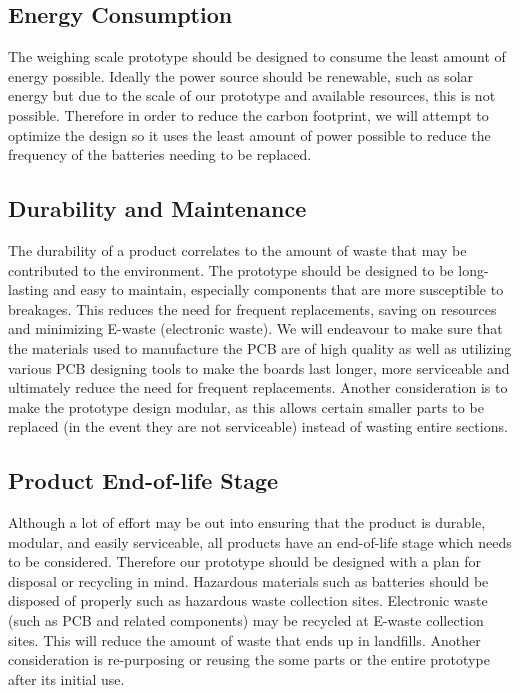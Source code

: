 \subsection{Energy Consumption}

The weighing scale prototype should be designed to consume the least amount of energy possible. Ideally the power source should be renewable, such as solar energy but due to the scale of our prototype and available resources, this is not possible. Therefore in order to reduce the carbon footprint, we will attempt to optimize the design so it uses the least amount of power possible to reduce the frequency of the batteries needing to be replaced.

\subsection{Durability and Maintenance}

The durability of a product correlates to the amount of waste that may be contributed to the environment. The prototype should be designed to be long-lasting and easy to maintain, especially components that are more susceptible to breakages. This reduces the need for frequent replacements, saving on resources and minimizing E-waste (electronic waste). We will endeavour to make sure that the materials used to manufacture the PCB are of high quality as well as utilizing various PCB designing tools to make the boards last longer, more serviceable and ultimately reduce the need for frequent replacements. Another consideration is to make the prototype design modular, as this allows certain smaller parts to be replaced (in the event they are not serviceable) instead of wasting entire sections. 

\subsection{Product End-of-life Stage}

Although a lot of effort may be out into ensuring that the product is durable, modular, and easily serviceable, all products have an end-of-life stage which needs to be considered. Therefore our prototype should be designed with a plan for disposal or recycling in mind. Hazardous materials such as batteries should be disposed of properly such as hazardous waste collection sites. Electronic waste (such as PCB and related components) may be recycled at E-waste collection sites. This will reduce the amount of waste that ends up in landfills. Another consideration is re-purposing or reusing the some parts or the entire prototype after its initial use.

